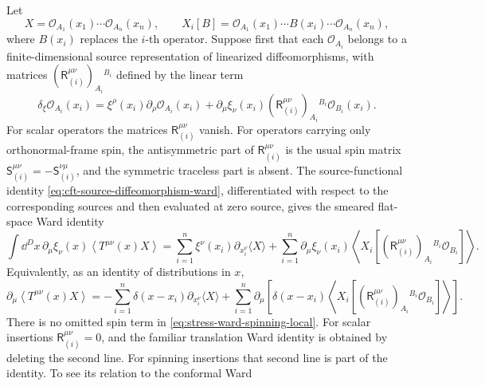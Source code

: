 \begin{proposition}
\label{prop:stress-ward-identity-spinning-insertions}
Let
\[
  X=
  \mathcal O_{A_1}(x_1)\cdots\mathcal O_{A_n}(x_n),
  \qquad
  X_i[B]=
  \mathcal O_{A_1}(x_1)\cdots B(x_i)\cdots
  \mathcal O_{A_n}(x_n),
\]
where \(B(x_i)\) replaces the \(i\)-th operator.  Suppose first that each
\(\mathcal O_{A_i}\) belongs to a finite-dimensional source representation of
linearized diffeomorphisms, with matrices
\((\mathsf R^{\mu\nu}_{(i)})_{A_i}{}^{B_i}\) defined by the linear term
\[
  \delta_\xi \mathcal O_{A_i}(x_i)
  =
  \xi^\rho(x_i)\partial_\rho\mathcal O_{A_i}(x_i)
  +
  \partial_\mu\xi_\nu(x_i)
  (\mathsf R^{\mu\nu}_{(i)})_{A_i}{}^{B_i}
  \mathcal O_{B_i}(x_i).
\]
For scalar operators the matrices \(\mathsf R^{\mu\nu}_{(i)}\) vanish.  For
operators carrying only orthonormal-frame spin, the antisymmetric part of
\(\mathsf R^{\mu\nu}_{(i)}\) is the usual spin matrix
\(\mathsf S^{\mu\nu}_{(i)}=-\mathsf S^{\nu\mu}_{(i)}\), and the symmetric
traceless part is absent.  The source-functional identity
\eqref{eq:cft-source-diffeomorphism-ward}, differentiated with respect to the
corresponding sources and then evaluated at zero source, gives the smeared
flat-space Ward identity
\begin{equation}
  \int\dd^D x\,
  \partial_\mu\xi_\nu(x)
  \left\langle T^{\mu\nu}(x)X\right\rangle
  =
  \sum_{i=1}^n
  \xi^\nu(x_i)\partial_{x_i^\nu}\langle X\rangle
  +
  \sum_{i=1}^n
  \partial_\mu\xi_\nu(x_i)
  \left\langle
    X_i[
    (\mathsf R^{\mu\nu}_{(i)})_{A_i}{}^{B_i}\mathcal O_{B_i}]
  \right\rangle .
  \label{eq:stress-ward-spinning-smeared}
\end{equation}
Equivalently, as an identity of distributions in \(x\),
\begin{equation}
  \partial_\mu
  \left\langle
  T^{\mu\nu}(x)X
  \right\rangle
  =
  -\sum_{i=1}^n
  \delta(x-x_i)
  \partial_{x_i^\nu}
  \langle X\rangle
  +
  \sum_{i=1}^n
  \partial_\mu
  \left[
    \delta(x-x_i)
    \left\langle
      X_i[
      (\mathsf R^{\mu\nu}_{(i)})_{A_i}{}^{B_i}\mathcal O_{B_i}]
    \right\rangle
  \right].
  \label{eq:stress-ward-spinning-local}
\end{equation}
There is no omitted spin term in
\eqref{eq:stress-ward-spinning-local}.  For scalar insertions
\(\mathsf R^{\mu\nu}_{(i)}=0\), and the familiar translation Ward identity is
obtained by deleting the second line.  For spinning insertions that second
line is part of the identity.  To see its relation to the conformal Ward

\end{proposition}
